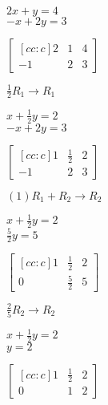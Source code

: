 \documentclass[letterpaper,12pt,fleqn]{article}
\begin{document}
\begin{example}
  \begin{minipage}[t]{2in}
    \vspace{0pt}
    $2x+y=4$ \\
    $-x+2y=3$
  \end{minipage}
  \begin{minipage}[t]{2in}
    \vspace{0pt}
    $\begin{bmatrix}[cc:c]
      2 & 1 & 4 \\
      -1 & 2 & 3
    \end{bmatrix}$
  \end{minipage}
\newpage
  $\frac{1}{2}R_1\rightarrow R_1$

  \begin{minipage}[t]{2in}
    \vspace{0pt}
    $x+\frac{1}{2}y=2$ \\
    $-x+2y=3$
  \end{minipage}
  \begin{minipage}[t]{2in}
    \vspace{0pt}
    $\begin{bmatrix}[cc:c]
      1 & \frac{1}{2} & 2 \\
      -1 & 2 & 3
    \end{bmatrix}$
  \end{minipage}

  \bigskip

  $(1)R_1+R_2\rightarrow R_2$

  \begin{minipage}[t]{2in}
    \vspace{0pt}
    $x+\frac{1}{2}y=2$ \\
    $\frac{5}{2}y=5$
  \end{minipage}
  \begin{minipage}[t]{2in}
    \vspace{0pt}
    $\begin{bmatrix}[cc:c]
      1 & \frac{1}{2} & 2 \\
      0 & \frac{5}{2} & 5
    \end{bmatrix}$
  \end{minipage}

  \bigskip

  $\frac{2}{5}R_2\rightarrow R_2$

  \begin{minipage}[t]{2in}
    \vspace{0pt}
    $x+\frac{1}{2}y=2$ \\
    $y=2$
  \end{minipage}
  \begin{minipage}[t]{2in}
    \vspace{0pt}
    $\begin{bmatrix}[cc:c]
      1 & \frac{1}{2} & 2 \\
      0 & 1 & 2
    \end{bmatrix}$
  \end{minipage}


\end{example}
\end{document}

